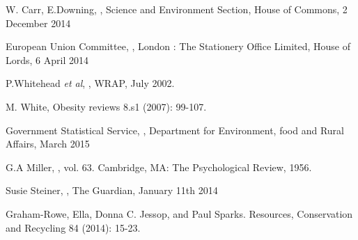 \documentclass[a4paper, 11pt]{article}
\begin{document}



\vspace{\baselineskip}
\vspace{\baselineskip}
\vspace{\baselineskip}


\clearpage



\begin{thebibliography}{29}

W. Carr, E.Downing, \emph{}, Science and Environment Section, House of Commons, 2 December 2014
\vspace{\baselineskip}

European Union Committee, \emph{}, London : The Stationery Office Limited, House of Lords, 6 April 2014
\vspace{\baselineskip}

P.Whitehead \emph{et al}, \emph{}, WRAP, July 2002.
\vspace{\baselineskip}

M. White, \emph{} Obesity reviews 8.s1 (2007): 99-107.
\vspace{\baselineskip}

Government Statistical Service, \emph{}, Department for Environment, food and Rural Affairs, March 2015
\vspace{\baselineskip}

G.A Miller, \emph{}, vol. 63. Cambridge, MA: The Psychological Review, 1956.
\vspace{\baselineskip}

Susie Steiner, \emph{}, The Guardian, January 11th 2014
\vspace{\baselineskip}

Graham-Rowe, Ella, Donna C. Jessop, and Paul Sparks.\emph{} Resources, Conservation and Recycling 84 (2014): 15-23.
\vspace{\baselineskip}


\end{thebibliography}
\end{document}
